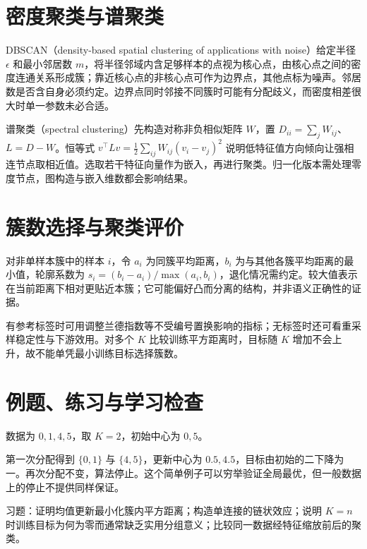 \section{密度聚类与谱聚类}

DBSCAN（density-based spatial clustering of applications with noise）给定半径 $\epsilon$ 和最小邻居数 $m$，将半径邻域内含足够样本的点视为核心点，由核心点之间的密度连通关系形成簇；靠近核心点的非核心点可作为边界点，其他点标为噪声。邻居数是否含自身必须约定。边界点同时邻接不同簇时可能有分配歧义，而密度相差很大时单一参数未必合适。

谱聚类（spectral clustering）先构造对称非负相似矩阵 $W$，置 $D_{ii}=\sum_jW_{ij}$、$L=D-W$。恒等式
$v^\top Lv=\tfrac12\sum_{ij}W_{ij}(v_i-v_j)^2$
说明低特征值方向倾向让强相连节点取相近值。选取若干特征向量作为嵌入，再进行聚类。归一化版本需处理零度节点，图构造与嵌入维数都会影响结果。

\section{簇数选择与聚类评价}

对非单样本簇中的样本 $i$，令 $a_i$ 为同簇平均距离，$b_i$ 为与其他各簇平均距离的最小值，轮廓系数为 $s_i=(b_i-a_i)/\max(a_i,b_i)$，退化情况需约定。较大值表示在当前距离下相对更贴近本簇；它可能偏好凸而分离的结构，并非语义正确性的证据。

有参考标签时可用调整兰德指数等不受编号置换影响的指标；无标签时还可看重采样稳定性与下游效用。对多个 $K$ 比较训练平方距离时，目标随 $K$ 增加不会上升，故不能单凭最小训练目标选择簇数。

\section{例题、练习与学习检查}

\begin{example}[一维均值聚类]
数据为 $0,1,4,5$，取 $K=2$，初始中心为 $0,5$。
\end{example}
\begin{solve}
第一次分配得到 $\{0,1\}$ 与 $\{4,5\}$，更新中心为 $0.5,4.5$，目标由初始的二下降为一。再次分配不变，算法停止。这个简单例子可以穷举验证全局最优，但一般数据上的停止不提供同样保证。
\end{solve}

习题：证明均值更新最小化簇内平方距离；构造单连接的链状效应；说明 $K=n$ 时训练目标为何为零而通常缺乏实用分组意义；比较同一数据经特征缩放前后的聚类。





